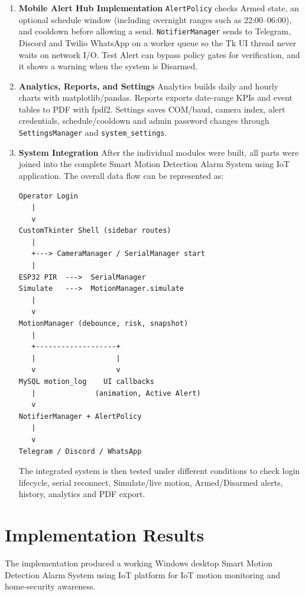 \documentclass[12pt,a4paper]{report}
\begin{document}
\begin{enumerate}
\item \textbf{Mobile Alert Hub Implementation}
\texttt{AlertPolicy} checks Armed state, an optional schedule window (including overnight ranges such as 22:00--06:00), and cooldown before allowing a send. \texttt{NotifierManager} sends to Telegram, Discord and Twilio WhatsApp on a worker queue so the Tk UI thread never waits on network I/O. Test Alert can bypass policy gates for verification, and it shows a warning when the system is Disarmed.

\item \textbf{Analytics, Reports, and Settings}
Analytics builds daily and hourly charts with matplotlib/pandas. Reports exports date-range KPIs and event tables to PDF with fpdf2. Settings saves COM/baud, camera index, alert credentials, schedule/cooldown and admin password changes through \texttt{SettingsManager} and \texttt{system\_settings}.

\item \textbf{System Integration}
After the individual modules were built, all parts were joined into the complete Smart Motion Detection Alarm System using IoT application. The overall data flow can be represented as:

\begin{verbatim}
Operator Login
   |
   v
CustomTkinter Shell (sidebar routes)
   |
   +---> CameraManager / SerialManager start
   |
ESP32 PIR  --->  SerialManager
Simulate   --->  MotionManager.simulate
   |
   v
MotionManager (debounce, risk, snapshot)
   |
   +-------------------+
   |                   |
   v                   v
MySQL motion_log    UI callbacks
   |              (animation, Active Alert)
   v
NotifierManager + AlertPolicy
   |
   v
Telegram / Discord / WhatsApp
\end{verbatim}

The integrated system is then tested under different conditions to check login lifecycle, serial reconnect, Simulate/live motion, Armed/Disarmed alerts, history, analytics and PDF export.

\end{enumerate}

\section{Implementation Results}

The implementation produced a working Windows desktop Smart Motion Detection Alarm System using IoT platform for IoT motion monitoring and home-security awareness.
\end{document}
